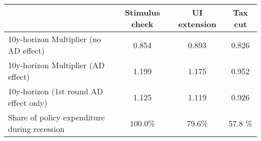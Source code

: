 \begin{tabular}{@{}lccc@{}} 
\toprule 
& Stimulus check    & UI extension    & Tax cut     \\  \midrule 
10y-horizon Multiplier (no AD effect) &0.854  & 0.893  & 0.826     \\ 
10y-horizon Multiplier (AD effect) &1.199  & 1.175  & 0.952     \\ 
10y-horizon (1st round AD effect only) &1.125  & 1.119  & 0.926     \\ 
Share of policy expenditure during recession &100.0\%  & 79.6\%  & 57.8 \%    \\ 
\end{tabular}  
